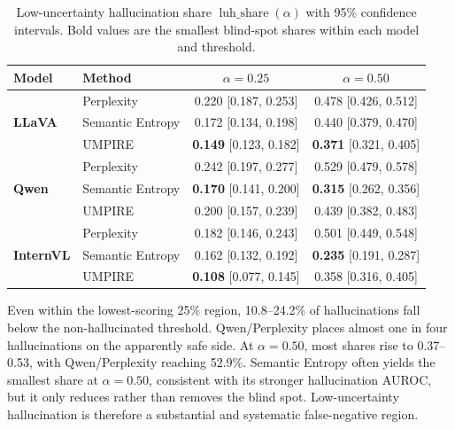 \begin{table}[H]
\centering
\caption{Low-uncertainty hallucination share $\operatorname{luh\_share}(\alpha)$ with 95\% confidence intervals. Bold values are the smallest blind-spot shares within each model and threshold.}
\label{tab:luh_share}
\small
\setlength{\tabcolsep}{8pt}
\renewcommand{\arraystretch}{1.18}
\begin{tabular}{@{}llcc@{}}
\toprule
\textbf{Model} & \textbf{Method} & \textbf{$\alpha=0.25$} & \textbf{$\alpha=0.50$} \\
\midrule
\multirow{3}{*}{\textbf{LLaVA}} & Perplexity & 0.220 {\scriptsize[0.187, 0.253]} & 0.478 {\scriptsize[0.426, 0.512]} \\
& Semantic Entropy & 0.172 {\scriptsize[0.134, 0.198]} & 0.440 {\scriptsize[0.379, 0.470]} \\
& UMPIRE & \textbf{0.149} {\scriptsize[0.123, 0.182]} & \textbf{0.371} {\scriptsize[0.321, 0.405]} \\
\midrule
\multirow{3}{*}{\textbf{Qwen}} & Perplexity & 0.242 {\scriptsize[0.197, 0.277]} & 0.529 {\scriptsize[0.479, 0.578]} \\
& Semantic Entropy & \textbf{0.170} {\scriptsize[0.141, 0.200]} & \textbf{0.315} {\scriptsize[0.262, 0.356]} \\
& UMPIRE & 0.200 {\scriptsize[0.157, 0.239]} & 0.439 {\scriptsize[0.382, 0.483]} \\
\midrule
\multirow{3}{*}{\textbf{InternVL}} & Perplexity & 0.182 {\scriptsize[0.146, 0.243]} & 0.501 {\scriptsize[0.449, 0.548]} \\
& Semantic Entropy & 0.162 {\scriptsize[0.132, 0.192]} & \textbf{0.235} {\scriptsize[0.191, 0.287]} \\
& UMPIRE & \textbf{0.108} {\scriptsize[0.077, 0.145]} & 0.358 {\scriptsize[0.316, 0.405]} \\
\bottomrule
\end{tabular}
\end{table}

Even within the lowest-scoring 25\% region, 10.8--24.2\% of hallucinations fall below the non-hallucinated threshold. Qwen/Perplexity places almost one in four hallucinations on the apparently safe side. At $\alpha=0.50$, most shares rise to 0.37--0.53, with Qwen/Perplexity reaching 52.9\%. Semantic Entropy often yields the smallest share at $\alpha=0.50$, consistent with its stronger hallucination AUROC, but it only reduces rather than removes the blind spot. Low-uncertainty hallucination is therefore a substantial and systematic false-negative region.

